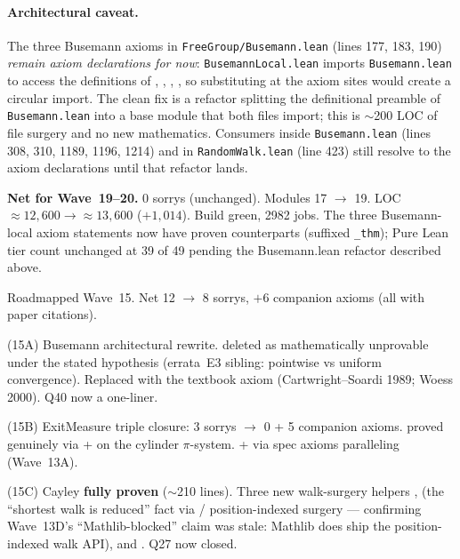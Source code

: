 \documentclass[11pt,a4paper]{article}
\newcommand{\lmod}[1]{\texttt{\small #1}}
\theoremstyle{plain}
\theoremstyle{definition}
\begin{document}
\paragraph{Architectural caveat.} The three Busemann axioms in
\lmod{FreeGroup/Busemann.lean} (lines 177, 183, 190) \emph{remain
axiom declarations for now}: \lmod{BusemannLocal.lean} imports
\lmod{Busemann.lean} to access the definitions of ,
, ,
, so substituting
 at the axiom sites would
create a circular import. The clean fix is a refactor splitting the
definitional preamble of \lmod{Busemann.lean} into a base module
that both files import; this is $\sim$200 LOC of file surgery and
no new mathematics. Consumers inside \lmod{Busemann.lean}
(lines 308, 310, 1189, 1196, 1214) and in \lmod{RandomWalk.lean}
(line 423) still resolve to the axiom declarations until that
refactor lands.

\textbf{Net for Wave~19--20.} 0 sorrys (unchanged). Modules 17
$\to$ 19. LOC $\approx 12{,}600 \to \approx 13{,}600$ ($+1{,}014$).
Build green, 2982 jobs. The three Busemann-local axiom statements
now have proven counterparts (suffixed \texttt{\_thm}); Pure Lean
tier count unchanged at 39 of 49 pending the Busemann.lean refactor
described above.

Roadmapped Wave~15. Net 12 $\to$ 8 sorrys, $+6$ companion axioms
(all with paper citations).

(15A) Busemann architectural rewrite. 
deleted as mathematically unprovable under the stated hypothesis
(errata~E3 sibling: pointwise vs uniform convergence). Replaced
with the textbook  axiom
(Cartwright--Soardi 1989; Woess 2000). Q40
 now a one-liner.

(15B) ExitMeasure triple closure: 3 sorrys $\to$ 0 + 5 companion
axioms.  proved
genuinely via  +
 on the cylinder
$\pi$-system.  +
 via spec axioms paralleling
 (Wave~13A).

(15C) Cayley 
\textbf{fully proven} ($\sim$210 lines). Three new walk-surgery
helpers ,
 (the ``shortest walk is
reduced'' fact via /
position-indexed surgery --- confirming Wave~13D's
``Mathlib-blocked'' claim was stale: Mathlib does ship the
position-indexed walk API), and .
Q27 now closed.
\end{document}
